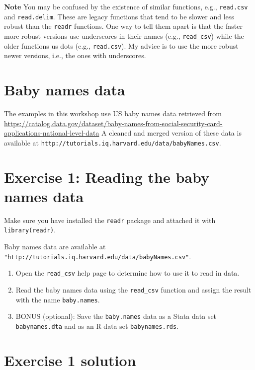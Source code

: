 \documentclass[]{book}
\begin{document}
\textbf{Note} You may be confused by the existence of similar functions,
e.g., \texttt{read.csv} and \texttt{read.delim}. These are legacy
functions that tend to be slower and less robust than the \texttt{readr}
functions. One way to tell them apart is that the faster more robust
versions use underscores in their names (e.g., \texttt{read\_csv}) while
the older functions us dots (e.g., \texttt{read.csv}). My advice is to
use the more robust newer versions, i.e., the ones with underscores.

\section{Baby names data}\label{baby-names-data}

The examples in this workshop use US baby names data retrieved from
\url{https://catalog.data.gov/dataset/baby-names-from-social-security-card-applications-national-level-data}
A cleaned and merged version of these data is available at
\texttt{http://tutorials.iq.harvard.edu/data/babyNames.csv}.

\section{Exercise 1: Reading the baby names
data}\label{exercise-1-reading-the-baby-names-data}

Make sure you have installed the \texttt{readr} package and attached it
with \texttt{library(readr)}.

Baby names data are available at
\texttt{"http://tutorials.iq.harvard.edu/data/babyNames.csv"}.

\begin{enumerate}
\def\labelenumi{\arabic{enumi}.}
\item
  Open the \texttt{read\_csv} help page to determine how to use it to
  read in data.
\item
  Read the baby names data using the \texttt{read\_csv} function and
  assign the result with the name \texttt{baby.names}.
\item
  BONUS (optional): Save the \texttt{baby.names} data as a Stata data
  set \texttt{babynames.dta} and as an R data set
  \texttt{babynames.rds}.
\end{enumerate}

\section{Exercise 1 solution}\label{exercise-1-solution}
\end{document}
